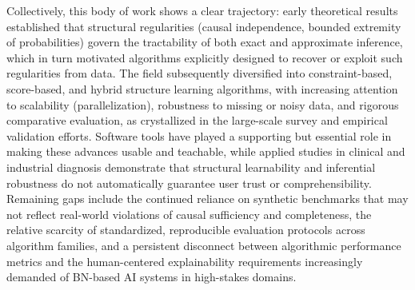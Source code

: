 Collectively, this body of work shows a clear trajectory: early theoretical results established that structural regularities (causal independence, bounded extremity of probabilities) govern the tractability of both exact and approximate inference, which in turn motivated algorithms explicitly designed to recover or exploit such regularities from data. The field subsequently diversified into constraint-based, score-based, and hybrid structure learning algorithms, with increasing attention to scalability (parallelization), robustness to missing or noisy data, and rigorous comparative evaluation, as crystallized in the large-scale survey and empirical validation efforts. Software tools have played a supporting but essential role in making these advances usable and teachable, while applied studies in clinical and industrial diagnosis demonstrate that structural learnability and inferential robustness do not automatically guarantee user trust or comprehensibility. Remaining gaps include the continued reliance on synthetic benchmarks that may not reflect real-world violations of causal sufficiency and completeness, the relative scarcity of standardized, reproducible evaluation protocols across algorithm families, and a persistent disconnect between algorithmic performance metrics and the human-centered explainability requirements increasingly demanded of BN-based AI systems in high-stakes domains.


